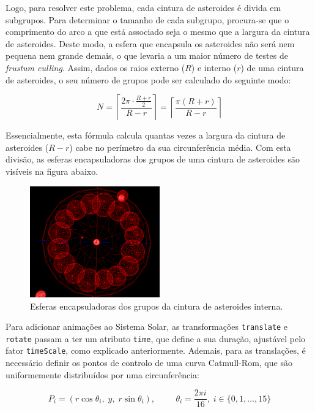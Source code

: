 \documentclass[12pt, a4paper]{article}
\begin{document}
Logo, para resolver este problema, cada cintura de asteroides é divida em subgrupos. Para determinar
o tamanho de cada subgrupo, procura-se que o comprimento do arco a que está associado seja o mesmo
que a largura da cintura de asteroides. Deste modo, a esfera que encapsula os asteroides não será
nem pequena nem grande demais, o que levaria a um maior número de testes de \emph{frustum culling}.
Assim, dados os raios externo ($R$) e interno ($r$) de uma cintura de asteroides, o seu número de
grupos pode ser calculado do seguinte modo:

$$
N = \left \lceil \frac{2 \pi \cdot \frac{R + r}{2}}{R - r} \right \rceil
  = \left \lceil \frac{\pi (R + r)}{R - r} \right \rceil
$$

Essencialmente, esta fórmula calcula quantas vezes a largura da cintura de asteroides ($R - r$) cabe
no perímetro da sua circunferência média. Com esta divisão, as esferas encapsuladoras dos grupos de
uma cintura de asteroides são visíveis na figura abaixo.

\begin{figure}[H]
    \centering
    \includegraphics[width=0.5\textwidth]{res/phase3/AsteroidBeltBoundingSpheres.png}
    \caption{Esferas encapsuladoras dos grupos da cintura de asteroides interna.}
\end{figure}

Para adicionar animações ao Sistema Solar, as transformações \texttt{translate} e \texttt{rotate}
passam a ter um atributo \texttt{time}, que define a sua duração, ajustável pelo fator
\texttt{timeScale}, como explicado anteriormente. Ademais, para as translações, é necessário definir
os pontos de controlo de uma curva Catmull-Rom, que são uniformemente distribuídos por uma
circunferência:

$$
P_i = (r \cos \theta_{i}, \; y, \; r \sin \theta_{i}),
\hspace{1cm}
\theta_{i} = \frac{2 \pi i}{16}, \;
i \in \lbrace 0, 1, \ldots, 15 \rbrace
$$
\end{document}
